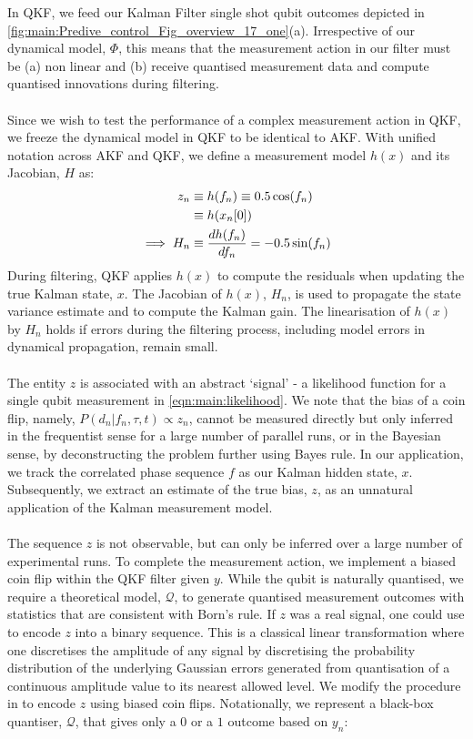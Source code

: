 In QKF, we feed our Kalman Filter single shot qubit outcomes depicted in \cref{fig:main:Predive_control_Fig_overview_17_one}(a). Irrespective of our dynamical model, $\Phi$, this means that the measurement action in our filter must be (a) non linear and (b) receive quantised measurement data and compute quantised innovations during filtering.
\\
\\
Since we wish to test the performance of a complex measurement action in QKF, we freeze the dynamical model in QKF to be identical to AKF. With unified notation across AKF and QKF, we define a measurement model $h(x)$ and its Jacobian, $H$ as:
\begin{align}
z_n &  \equiv h(f_n) \equiv 0.5\cos(f_{n}) \\
& \equiv h(x_n[0]) \\
\implies H_n &\equiv \frac{d h(f_n)}{df_n} =  -0.5\sin(f_{n})
\end{align}
During filtering, QKF applies $h(x)$ to compute the residuals when updating the true Kalman state, $x$. The Jacobian of $h(x)$, $H_n$, is used to propagate the state variance estimate and to compute the Kalman gain. The linearisation of $h(x)$ by $H_n$ holds if errors during the filtering process, including model errors in dynamical propagation, remain small. 
\\
\\
The entity $z$ is associated with an abstract `signal' - a likelihood function for a single qubit measurement in \cref{eqn:main:likelihood}. We note that the bias of a coin flip, namely, $ P(d_n|f_n, \tau, t) \propto z_n$, cannot be measured directly but only inferred in the frequentist sense for a large number of parallel runs, or in the Bayesian sense, by deconstructing the problem further using Bayes rule. In our application, we track  the correlated phase sequence $f$ as our Kalman hidden state, $x$. Subsequently, we extract an estimate of the true bias, $z$, as an unnatural application of the Kalman measurement model.  
\\
\\
The sequence $z$ is not observable, but can only be inferred over a large number of experimental runs. To complete the measurement action, we implement a biased coin flip within the QKF filter given $y$.   While the qubit is naturally quantised, we require a theoretical model, $\mathcal{Q}$, to generate quantised measurement outcomes with statistics that are consistent with Born's rule. If $z$ was a real signal, one could use \cite{karlsson2005} to encode $z$ into a binary sequence. This is a classical linear transformation where one discretises the amplitude of any signal by discretising the probability distribution of the underlying Gaussian errors generated from quantisation of a continuous amplitude value to its nearest allowed level. We modify the procedure in \cite{karlsson2005} to encode $z$ using biased coin flips. Notationally, we represent a black-box quantiser, $\mathcal{Q}$, that gives only a $0$ or a $1$ outcome based on $y_n$:
